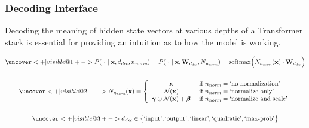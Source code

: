 \documentclass[aspectratio=169, 12pt]{beamer}
\newcommand{\gbm}[1]{\bm{\mathbf{#1}}} %
\begin{document}
    \subsubsection{Decoding Interface}
    \begin{frame}{}
        Decoding the meaning of hidden state vectors at various depths of a Transformer stack is essential for providing an intuition as to how the model is working.

        \begin{equation*}
        \begin{gathered}
            \uncover<+|visible@1+->{
                P(\ \cdot \mid \gbm{x}, d_{\textit{dec}}, n_{\textit{norm}}) = P(\ \cdot \mid \gbm{x}, \gbm{W}_{d_{\textit{dec}}}, N_{n_{\textit{norm}}}) = \operatorname{softmax}\Bigl(N_{n_{\textit{norm}}}(\gbm{x}) \cdot \gbm{W}_{d_{\textit{dec}}}\Bigr)
            }\\[15pt]
            \uncover<+|visible@2+->{
                N_{n_{\textit{norm}}}(\gbm{x}) = 
                \left\{
                \begin{array}{cl}
                    \gbm{x} &\ \text{if}\ n_{\textit{norm}} = \text{`no normalization'} \\
                    \mathcal{N}{(\gbm{x})} &\ \text{if}\ n_{\textit{norm}} = \text{`normalize only'} \\
                    \gbm{\gamma} \odot \mathcal{N}{(\gbm{x})} + \gbm{\beta} &\ \text{if}\ n_{\textit{norm}} = \text{`normalize and scale'}
                \end{array}
                \right.
            }\\[15pt]
            \uncover<+|visible@3+->{
                d_{\textit{dec}} \in \bigl\{\text{`input'}, \text{`output'}, \text{`linear'}, \text{`quadratic'}, \text{`max-prob'} \bigr\}
            }\\
        \end{gathered}
        \end{equation*}
    \end{frame}
\end{document}
